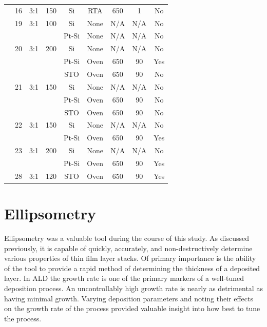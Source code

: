 {\begin{longtable}{ccccccccc}
		&16		&3:1		&150	&Si		&RTA	&650	&1		&No\\
		&19		&3:1		&100	&Si		&None 	&N/A		&N/A		&No\\
		&		&		&		&Pt-Si	&None 	&N/A		&N/A		&No\\
		&20		&3:1		&200	&Si		&None 	&N/A		&N/A		&No\\
		&		&		&		&Pt-Si	&Oven	&650	&90		&Yes\\
		&		&		&		&STO	&Oven	&650	&90		&No\\
		&21		&3:1		&150	&Si		&None 	&N/A		&N/A		&No\\
		&		&		&		&Pt-Si	&Oven	&650	&90		&No\\
		&		&		&		&STO	&Oven	&650	&90		&No\\
		&22		&3:1		&150	&Si		&None 	&N/A		&N/A		&No\\
		&		&		&		&Pt-Si	&Oven	&650	&90		&Yes\\
		&23		&3:1		&200	&Si		&None 	&N/A		&N/A		&No\\
		&		&		&		&Pt-Si	&Oven	&650	&90		&Yes\\
		&28		&3:1		&120	&STO	&Oven	&650	&90		&Yes\\
	\bottomrule
\end{longtable}}


\section{Ellipsometry}
\label{chap:Results-Ellipsometry}

Ellipsometry was a valuable tool during the course of this study. As discussed previously, it is capable of quickly, accurately, and non-destructively determine various properties of thin film layer stacks. Of primary importance is the ability of the tool to provide a rapid method of determining the thickness of a deposited layer. In ALD the growth rate is one of the primary markers of a well-tuned deposition process. An uncontrollably high growth rate is nearly as detrimental as having minimal growth. Varying deposition parameters and noting their effects on the growth rate of the process provided valuable insight into how best to tune the process. 

